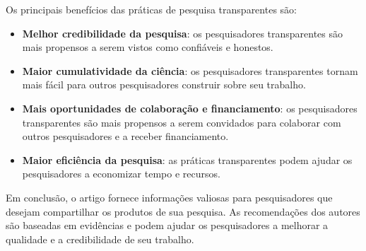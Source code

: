 \documentclass[
  a4paper,
]{article}
\begin{document}
\begin{tcolorbox}
Os principais benefícios das práticas de pesquisa transparentes são:

\begin{itemize}
\item
  \textbf{Melhor credibilidade da pesquisa}: os pesquisadores
  transparentes são mais propensos a serem vistos como confiáveis e
  honestos.
\item
  \textbf{Maior cumulatividade da ciência}: os pesquisadores
  transparentes tornam mais fácil para outros pesquisadores construir
  sobre seu trabalho.
\item
  \textbf{Mais oportunidades de colaboração e financiamento}: os
  pesquisadores transparentes são mais propensos a serem convidados para
  colaborar com outros pesquisadores e a receber financiamento.
\item
  \textbf{Maior eficiência da pesquisa}: as práticas transparentes podem
  ajudar os pesquisadores a economizar tempo e recursos.
\end{itemize}

Em conclusão, o artigo fornece informações valiosas para pesquisadores
que desejam compartilhar os produtos de sua pesquisa. As recomendações
dos autores são baseadas em evidências e podem ajudar os pesquisadores a
melhorar a qualidade e a credibilidade de seu trabalho.

\end{tcolorbox}
\end{document}
